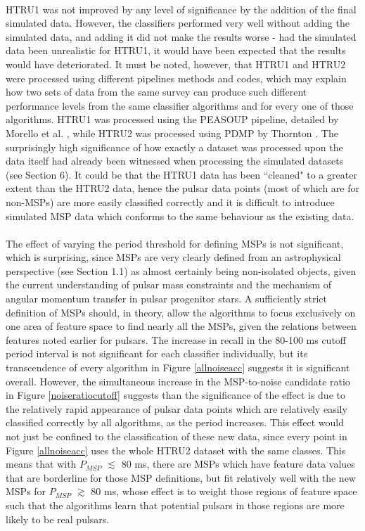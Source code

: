 \documentclass[12pt]{article}
\begin{document}
\paragraph{}
HTRU1 was not improved by any level of significance by the addition of the final simulated data. However, the classifiers performed very well without adding the simulated data, and adding it did not make the results worse - had the simulated data been unrealistic for HTRU1, it would have been expected that the results would have deteriorated. It must be noted, however, that HTRU1 and HTRU2 were processed using different pipelines methods and codes, which may explain how two sets of data from the same survey can produce such different performance levels from the same classifier algorithms and for every one of those algorithms. HTRU1 was processed using the PEASOUP pipeline, detailed by Morello et al. \cite{morello2014spinn}, while HTRU2 was processed using PDMP by Thornton \cite{thornton2013high}. The surprisingly high significance of how exactly a dataset was processed upon the data itself had already been witnessed when processing the simulated datasets (see Section 6). It could be that the HTRU1 data has been ``cleaned" to a greater extent than the HTRU2 data, hence the pulsar data points (most of which are for non-MSPs) are more easily classified correctly and it is difficult to introduce simulated MSP data which conforms to the same behaviour as the existing data.
\paragraph{}
The effect of varying the period threshold for defining MSPs is not significant, which is surprising, since MSPs are very clearly defined from an astrophysical perspective (see Section 1.1) as almost certainly being non-isolated objects, given the current understanding of pulsar mass constraints and the mechanism of angular momentum transfer in pulsar progenitor stars.  A sufficiently strict definition of MSPs should, in theory, allow the algorithms to focus exclusively on one area of feature space to find nearly all the MSPs, given the relations between features noted earlier for pulsars. The increase in recall in the 80-100 ms cutoff period interval is not significant for each classifier individually, but its transcendence of every algorithm in Figure \ref{allnoiseacc} suggests it is significant overall. However, the simultaneous increase in the MSP-to-noise candidate ratio in Figure \ref{noiseratiocutoff} suggests than the significance of the effect is due to the relatively rapid appearance of pulsar data points which are relatively easily classified correctly by all algorithms, as the period increases. This effect would not just be confined to the classification of these new data, since every point in Figure \ref{allnoiseacc} uses the whole HTRU2 dataset with the same classes. This means that with $P_{MSP}$ $\lesssim$ 80 ms, there are MSPs which have feature data values that are borderline for those MSP definitions, but fit relatively well with the new MSPs for $P_{MSP}$ $\gtrsim$ 80 ms, whose effect is to weight those regions of feature space such that the algorithms learn that potential pulsars in those regions are more likely to be real pulsars.
\end{document}

